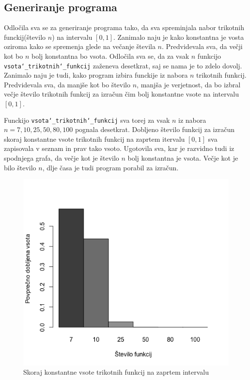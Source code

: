 \documentclass[11pt]{article}
\theoremstyle{definition}
\newcommand{\1}{\mathbbm{1}}
\begin{document}

\subsection{Generiranje programa}
\vspace{0.5cm}

Odločila sva se za generiranje programa tako, da sva spreminjala nabor trikotnih funckij(število $n$) na intervalu $[0,1]$. Zanimalo naju je kako konstantna je vosta oziroma kako se spremenja glede na večanje števila $n$. Predvidevala sva, da večji kot bo $n$ bolj konstantna bo vsota. Odločila sva se, da za vsak $n$ funkcijo \texttt{vsota\char`_trikotnih\char`_funkcij} zaženeva desetkrat, saj se nama je to zdelo dovolj. 
Zanimalo naju je tudi, kako program izbira funckije iz nabora $n$ trikotnih funkcij. Predvidevala sva, da manjše kot bo število $n$, manjša je verjetnost, da bo izbral večje število trikotnih funkcij za izračun čim bolj konstantne vsote na intervalu $[0,1]$. \\
\vspace{0.25cm}

Funckijo \texttt{vsota\char`_trikotnih\char`_funkcij} sva torej za vsak $n$ iz nabora $n = {7, 10, 25, 50, 80, 100}$ pognala desetkrat. Dobljeno število funkcij za izračun skoraj konstantne vsote trikotnih funkcij na zaprtem itervalu $[0,1]$ sva zapisovala v seznam in prav tako vsoto. 
Ugotovila sva, kar je razvidno tudi iz spodnjega grafa, da večje kot je število $n$ bolj konstantna je vsota. Večje kot je bilo število $n$, dlje časa je tudi program porabil za izračun. \\
\begin{figure}[h!]
	\centering
	\includegraphics[scale=0.55]{vsota.png}
	\caption{Skoraj konstantne vsote trikotnih funkcij na zaprtem intervalu}
\end{figure} \\
\end{document}
